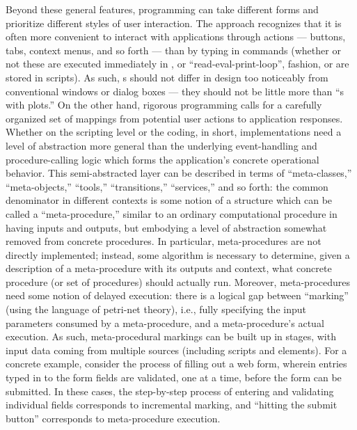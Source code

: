 \documentclass[11pt,letterpaper]{article}
\newcommand{\ATextCClr}[1]{\textcolor{atcColor}{\textbf{#1}}}
\newcommand{\MdsX}{\resizebox{!}{7.5pt}{\ATextCClr{MdsX}}}
\newcommand{\GUI}{\resizebox{!}{7pt}{\AcronymText{GUI}}}
\newcommand{\textscc}[1]{{\color{orr!35!black}{{%
						\fontfamily{Cabin-TLF}\fontseries{b}\selectfont{\textsc{\scriptsize{#1}}}}}}}
\newcommand{\AcronymText}[1]{{\textscc{#1}}}
\newcommand{\p}[1]{

\vspace{1em}#1}
\newcommand{\q}[1]{{\fontfamily{qcr}\selectfont ``}#1{\fontfamily{qcr}\selectfont ''}}
\begin{document}
{\p{Beyond these general features, \IDN{} 
programming can take different forms and 
prioritize different styles of user 
interaction.  The \MdsX{} approach recognizes 
that it is often more convenient to 
interact with applications through 
\GUI{} actions --- buttons, tabs, context 
menus, and so forth --- than by typing 
in commands (whether or not these are 
executed immediately in \REPL{}, or 
\q{read-eval-print-loop}, fashion, or are 
stored in scripts).  As such, \IDN{}s 
should not differ in design too noticeably 
from conventional \GUI{} windows or dialog 
boxes --- they should not be little more 
than \q{\REPL{}s with plots.}  On the other 
hand, rigorous \GUI{} programming 
calls for a carefully organized 
set of mappings from potential user 
actions to application responses.  
Whether on the scripting level or 
the \GUI{} coding, in short, 
implementations need a level of abstraction 
more general than the underlying event-handling 
and procedure-calling logic which forms 
the application's concrete operational 
behavior.  This semi-abstracted layer 
can be described in terms of \q{meta-classes,} 
\q{meta-objects,} \q{tools,} \q{transitions,} 
\q{services,} and so forth: the common 
denominator in different contexts is some 
notion of a structure which can be called 
a \q{meta-procedure,} similar to an ordinary 
computational procedure in having inputs and 
outputs, but embodying a level of abstraction 
somewhat removed from concrete procedures.  
In particular, meta-procedures are not 
directly implemented; instead, some algorithm 
is necessary to determine, given a description 
of a meta-procedure with its outputs and 
context, what concrete procedure (or set of 
procedures) should actually run.  Moreover, 
meta-procedures need some notion of delayed 
execution: there is a logical gap between 
\q{marking} (using the language of petri-net 
theory), i.e., fully specifying the input 
parameters consumed by a meta-procedure, and a 
meta-procedure's actual execution.  
As such, meta-procedural markings can be 
built up in stages, with input data coming 
from multiple sources (including scripts and 
\GUI{} elements).  For a concrete example, 
consider the process of filling out a web 
form, wherein entries typed in to the form 
fields are validated, one at a time, 
before the form can be submitted.  
In these cases, the step-by-step process of 
entering and validating individual fields 
corresponds to incremental marking, and 
\q{hitting the submit button} corresponds 
to meta-procedure execution.}

}
\end{document}
